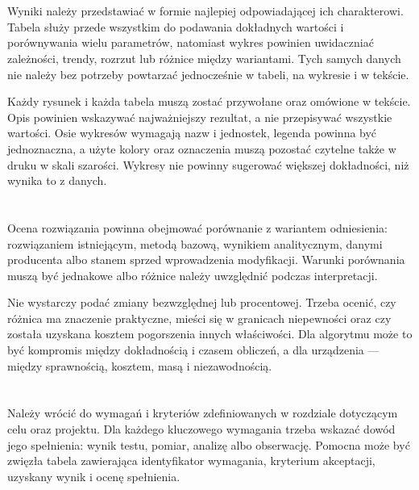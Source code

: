 \section{}

Wyniki należy przedstawiać w formie najlepiej odpowiadającej ich charakterowi. Tabela służy przede wszystkim do podawania dokładnych wartości i porównywania wielu parametrów, natomiast wykres powinien uwidaczniać zależności, trendy, rozrzut lub różnice między wariantami. Tych samych danych nie należy bez potrzeby powtarzać jednocześnie w tabeli, na wykresie i w tekście.

Każdy rysunek i każda tabela muszą zostać przywołane oraz omówione w tekście. Opis powinien wskazywać najważniejszy rezultat, a nie przepisywać wszystkie wartości. Osie wykresów wymagają nazw i jednostek, legenda powinna być jednoznaczna, a użyte kolory oraz oznaczenia muszą pozostać czytelne także w druku w skali szarości. Wykresy nie powinny sugerować większej dokładności, niż wynika to z danych.

\section{}

Ocena rozwiązania powinna obejmować porównanie z wariantem odniesienia: rozwiązaniem istniejącym, metodą bazową, wynikiem analitycznym, danymi producenta albo stanem sprzed wprowadzenia modyfikacji. Warunki porównania muszą być jednakowe albo różnice należy uwzględnić podczas interpretacji.

Nie wystarczy podać zmiany bezwzględnej lub procentowej. Trzeba ocenić, czy różnica ma znaczenie praktyczne, mieści się w granicach niepewności oraz czy została uzyskana kosztem pogorszenia innych właściwości. Dla algorytmu może to być kompromis między dokładnością i czasem obliczeń, a dla urządzenia — między sprawnością, kosztem, masą i niezawodnością.

\section{}

Należy wrócić do wymagań i kryteriów zdefiniowanych w rozdziale dotyczącym celu oraz projektu. Dla każdego kluczowego wymagania trzeba wskazać dowód jego spełnienia: wynik testu, pomiar, analizę albo obserwację. Pomocna może być zwięzła tabela zawierająca identyfikator wymagania, kryterium akceptacji, uzyskany wynik i ocenę spełnienia.

